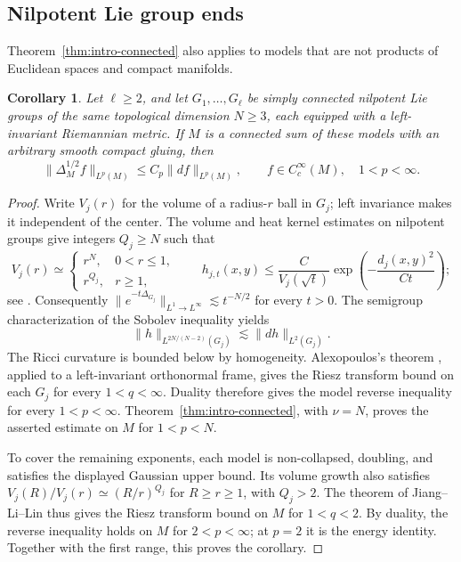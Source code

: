 \documentclass[12pt]{amsart}
\newtheorem{corollary}[theorem]{Corollary}
\theoremstyle{remark}
\begin{document}
\subsection{Nilpotent Lie group ends}

Theorem~\ref{thm:intro-connected} also applies to models that are not
products of Euclidean spaces and compact manifolds.

\begin{corollary}\label{cor:nilpotent-ends}
Let $\ell\geq2$, and let $G_1,\ldots,G_\ell$ be simply connected nilpotent Lie groups of
the same topological dimension $N\geq3$, each equipped with a
left-invariant Riemannian metric.  If $M$ is a connected sum of these
models with an arbitrary smooth compact gluing, then
\[
 \|\Delta_M^{1/2}f\|_{L^p(M)}
 \leq C_p\|df\|_{L^p(M)},
 \qquad f\in C_c^\infty(M),\quad 1<p<\infty.
\]
\end{corollary}

\begin{proof}
Write $V_j(r)$ for the volume of a radius-$r$ ball in $G_j$; left
invariance makes it independent of the center.  The volume and heat
kernel estimates on nilpotent groups give integers $Q_j\geq N$ such
that
\[
 V_j(r)\simeq
 \begin{cases}
  r^N,&0<r\leq1,\\
  r^{Q_j},&r\geq1,
 \end{cases}
 \qquad
 h_{j,t}(x,y)\leq
 \frac{C}{V_j(\sqrt t)}
 \exp\!\left(-\frac{d_j(x,y)^2}{Ct}\right);
\]
see \cite[Chapter~IV]{VaropoulosSaloffCosteCoulhon92}.  Consequently
$\|e^{-t\Delta_{G_j}}\|_{L^1\to L^\infty}\lesssim t^{-N/2}$ for
every $t>0$.  The semigroup characterization of the Sobolev inequality
\cite{Varopoulos85} yields
\[
 \|h\|_{L^{2N/(N-2)}(G_j)}\lesssim\|dh\|_{L^2(G_j)}.
\]
The Ricci curvature is bounded below by homogeneity.  Alexopoulos's
theorem \cite[Theorem~2]{Alexopoulos92}, applied to a left-invariant orthonormal
frame, gives the Riesz transform bound on each $G_j$ for every
$1<q<\infty$.  Duality therefore gives the model reverse inequality
for every $1<p<\infty$.  Theorem~\ref{thm:intro-connected}, with
$\nu=N$, proves the asserted estimate on $M$ for $1<p<N$.

To cover the remaining exponents, each model is non-collapsed, doubling,
and satisfies the displayed Gaussian upper bound.  Its volume growth
also satisfies
$V_j(R)/V_j(r)\simeq(R/r)^{Q_j}$ for $R\geq r\geq1$, with
$Q_j>2$.  The theorem of Jiang--Li--Lin
\cite{JiangLiLin25} thus gives the Riesz transform bound
on $M$ for $1<q<2$.  By duality, the reverse inequality holds on $M$
for $2<p<\infty$; at $p=2$ it is the energy identity.  Together with
the first range, this proves the corollary.
\end{proof}
\end{document}
